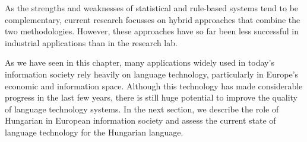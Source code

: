 \begin{multicols}{2}
  As the strengths and weaknesses of statistical and rule-based systems tend to be complementary, current research focusses on hybrid approaches that combine the two methodologies. However, these approaches have so far been less successful in industrial applications than in the research lab. 

  As we have seen in this chapter, many applications widely used in today’s information society rely heavily on language technology, particularly in Europe’s economic and information space. Although this technology has made considerable progress in the last few years, there is still huge potential to improve the quality of language technology systems. In the next section, we describe the role of Hungarian in European information society and assess the current state of language technology for the Hungarian language.
  \end{multicols}

  \clearpage


